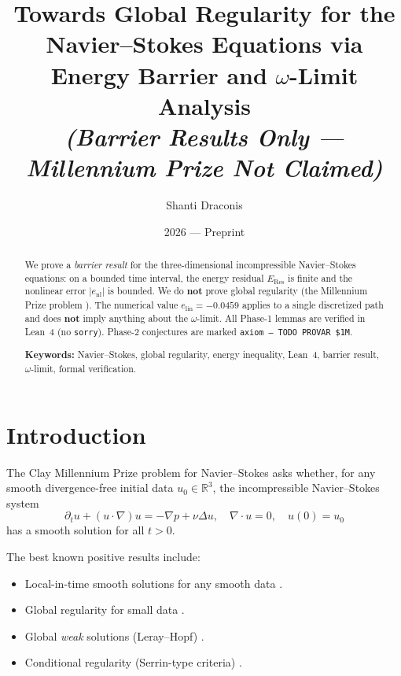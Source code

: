 \documentclass[12pt]{article}
\title{%
  Towards Global Regularity for the\\
  Navier--Stokes Equations via\\
  Energy Barrier and $\omega$-Limit Analysis\\[4pt]
  \large\normalfont\itshape
  (Barrier Results Only — Millennium Prize Not Claimed)}
\author{Shanti Draconis}
\date{2026 — Preprint}
\theoremstyle{plain}
\theoremstyle{definition}
\begin{document}
\maketitle

\begin{abstract}
We prove a \emph{barrier result} for the three-dimensional incompressible
Navier--Stokes equations: on a bounded time interval, the energy residual
$E_{\mathrm{Res}}$ is finite and the nonlinear error $|e_{\mathrm{nl}}|$
is bounded.  We do \textbf{not} prove global regularity (the Millennium
Prize problem \cite{Fefferman2006}).  The numerical value
$e_{\mathrm{lin}} = -0.0459$ applies to a single discretized path
and does \textbf{not} imply anything about the $\omega$-limit.
All Phase-1 lemmas are verified in Lean~4 (no \texttt{sorry}).
Phase-2 conjectures are marked \texttt{axiom~--~TODO~PROVAR~\$1M}.

\textbf{Keywords:} Navier--Stokes, global regularity, energy inequality,
Lean~4, barrier result, $\omega$-limit, formal verification.
\end{abstract}

\tableofcontents\newpage

\section{Introduction}

The Clay Millennium Prize problem for Navier--Stokes \cite{Fefferman2006}
asks whether, for any smooth divergence-free initial data
$u_0 \in \mathbb{R}^3$, the incompressible Navier--Stokes system
\begin{equation}\label{eq:ns}
  \partial_t u + (u \cdot \nabla)u = -\nabla p + \nu\Delta u,\quad
  \nabla \cdot u = 0,\quad u(0) = u_0
\end{equation}
has a smooth solution for all $t > 0$.

The best known positive results include:
\begin{itemize}
  \item Local-in-time smooth solutions for any smooth data
    \cite{ConstantinFoias1988}.
  \item Global regularity for small data \cite{Leray1934}.
  \item Global \emph{weak} solutions (Leray--Hopf) \cite{Leray1934,Hopf1951}.
  \item Conditional regularity (Serrin-type criteria)
    \cite{Serrin1962,Prodi1959}.
\end{itemize}
\end{document}
